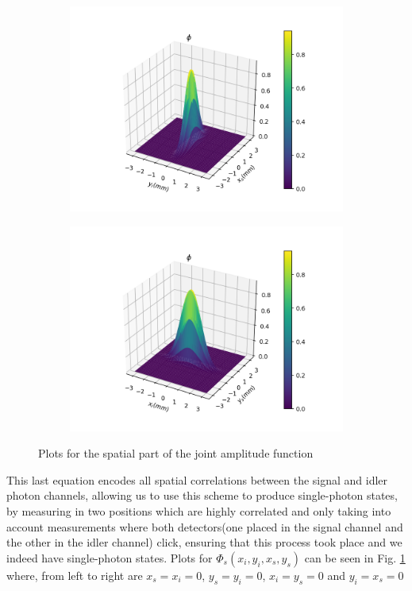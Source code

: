 \documentclass{book}
\begin{document}
\begin{figure}[H]
\begin{subfigure}[b]{0.45\linewidth}
\includegraphics[width=\linewidth]{images/SPDC_yx.png}
\end{subfigure}
\begin{subfigure}[b]{0.45\linewidth}
\includegraphics[width=\linewidth]{images/SPDC_xy.png}
\end{subfigure}
\caption{Plots for the spatial part of the joint amplitude function}
\label{SPDC}
\end{figure}

This last equation encodes all spatial correlations between the signal and idler photon channels, allowing us to use this scheme to produce single-photon states, by measuring in two positions which are highly correlated and only taking into account measurements where both detectors(one placed in the signal channel and the other in the idler channel) click, ensuring that this process took place and we indeed have single-photon states. Plots for $\Phi_{s}(x_{i},y_{i},x_{s},y_{s})$ can be seen in Fig. \ref{SPDC} where, from left to right are $x_{s}=x_{i}=0$, $y_{s}=y_{i}=0$, $x_{i}=y_{s}=0$ and $y_{i}=x_{s}=0$
\end{document}
